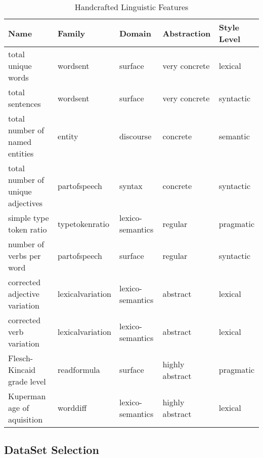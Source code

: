 \documentclass[runningheads,a4paper,11pt]{article}
\begin{document}
\begin{table}[ht]
    \setlength\tabcolsep{6pt}
    \centering
    \begin{tabular}{@{}lllll@{}}\toprule
        Name                              & Family           & Domain           & Abstraction     & Style Level\footnotemark \\ \toprule
        total unique words                & wordsent         & surface          & very concrete   & lexical                  \\
        total sentences                   & wordsent         & surface          & very concrete   & syntactic                \\ \bottomrule
        total number of named entities    & entity           & discourse        & concrete        & semantic                 \\
        total number of unique adjectives & partofspeech     & syntax           & concrete        & syntactic                \\ \bottomrule
        simple type token ratio           & typetokenratio   & lexico-semantics & regular         & pragmatic                \\
        number of verbs per word          & partofspeech     & surface          & regular         & syntactic                \\ \bottomrule
        corrected adjective variation     & lexicalvariation & lexico-semantics & abstract        & lexical                  \\
        corrected verb variation          & lexicalvariation & lexico-semantics & abstract        & lexical                  \\ \bottomrule
        Flesch-Kincaid grade level        & readformula      & surface          & highly abstract & pragmatic                \\
        Kuperman age of aquisition        & worddiff         & lexico-semantics & highly abstract & lexical                  \\ \bottomrule
    \end{tabular}
    \caption{Handcrafted Linguistic Features}\label{table-hlf}
\end{table}


\subsection{DataSet Selection}\label{ds-selection}
\end{document}
